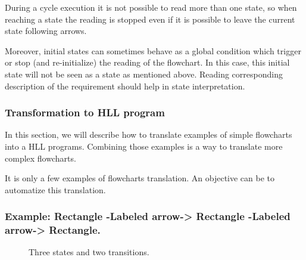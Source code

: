 During a cycle execution it is not possible to read more than one
state, so when reaching a state the reading is stopped even if it is
possible to leave the current state following arrows. 

Moreover, initial states can sometimes behave as a global condition
which trigger or stop (and re-initialize) the reading of the
flowchart. In this case, this initial state will not be seen as a
state as mentioned above. Reading corresponding description of the
requirement should help in state interpretation.


\subsubsection{Transformation to HLL program}
\label{transformation-to-hll-program}
In this section, we will describe how to translate examples of simple
flowcharts into a HLL programs. Combining those examples is a way to
translate more complex flowcharts.

It is only a few examples of flowcharts translation. An objective can
be to automatize this translation.


\subsubsection{Example: Rectangle -Labeled arrow-> Rectangle -Labeled arrow-> Rectangle.}
\begin{figure}[h]
\centering
{}
\caption{Three states and two transitions.}
\label{example-1}
\end{figure}


